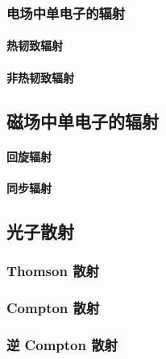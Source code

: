 \subsubsection{电场中单电子的辐射}

\paragraph{热韧致辐射}

\paragraph{非热韧致辐射}

\subsection{磁场中单电子的辐射}

\paragraph{回旋辐射}

\paragraph{同步辐射}

\subsection{光子散射}

\subsubsection{Thomson 散射}

\subsubsection{Compton 散射}

\subsubsection{逆 Compton 散射}
